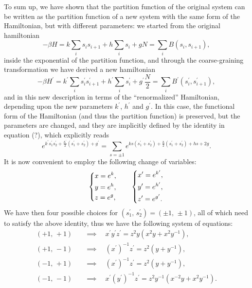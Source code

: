 To sum up, we have shown that the partition function of the original system can be written as the partition function of a new system with the same form of the Hamiltonian, but with different parameters: we started from the original hamiltonian
\[
    - \beta H = k \sum_i s_i s_{i+1} + h \sum_i s_i + g N = \sum_i B(s_i, s_{i+1}),
\]
inside the exponential of the partition function, and through the coarse-graining transformation we have derived a new hamiltonian
\[
    - \beta H^{\prime} = k^{\prime} \sum_i s_i^{\prime} s_{i+1}^{\prime} + h^{\prime} \sum_i s_i^{\prime} + g^{\prime} \frac{N}{2} = \sum_i B^{\prime}(s_i^{\prime}, s_{i+1}^{\prime}),
\]
and in this new description in terms of the ``renormalized'' Hamiltonian, depending upon the new parameters \(k^{\prime}\), \(h^{\prime}\) and \(g^{\prime}\). In this case, the functional form of the Hamiltonian (and thus the partition function) is preserved, but the parameters are changed, and they are implicitly defined by the identity in equation (?), which explicitly reads
\[
    e^{k^{\prime} s_1^{\prime} s_2^{\prime} + \frac{h^{\prime}}{2} (s_1^{\prime} + s_2^{\prime}) + g^{\prime}} = \sum_{s = \pm 1} e^{k s (s_1^{\prime} + s_2^{\prime}) + \frac{h}{2} (s_1^{\prime} + s_2^{\prime}) + hs + 2g}.
\]
It is now convenient to employ the following change of variables:
\[
    \begin{dcases}
        x = e^k, \\
        y = e^h, \\
        z = e^g,
    \end{dcases} \qquad \begin{dcases}
        x^{\prime} = e^{k^{\prime}}, \\
        y^{\prime} = e^{h^{\prime}}, \\
        z^{\prime} = e^{g^{\prime}}.
    \end{dcases}
\]
We have then four possible choices for \((s^{\prime}_1,\,s^{\prime}_2) = (\pm 1,\, \pm 1)\), all of which need to satisfy the above identity, thus we have the following system of equations:
\[
    \begin{aligned}
        (+1,\,+1) \quad & \implies \quad x^{\prime} y^{\prime} z^{\prime} = z^2 y (x^2 y + x^2 y^{-1}),                \\
        (+1,\,-1) \quad & \implies \quad (x^{\prime})^{-1} z^{\prime} = z^2 (y + y^{-1}),                              \\
        (-1,\,+1) \quad & \implies \quad (x^{\prime})^{-1} z^{\prime} = z^2 (y + y^{-1}),                              \\
        (-1,\,-1) \quad & \implies \quad x^{\prime} (y^{\prime})^{-1} z^{\prime} = z^2 y^{-1} (x^{-2} y + x^2 y^{-1}).
    \end{aligned}
\]
